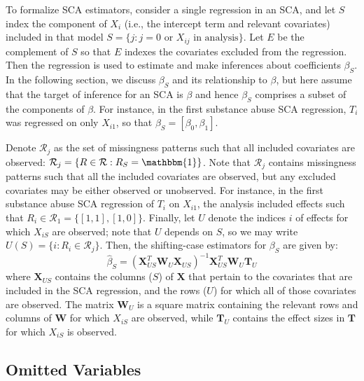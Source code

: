 \documentclass[
]{article}
\begin{document}
To formalize SCA estimators, consider a single regression in an SCA, and let \(S\) index the component of \(X_i\) (i.e., the intercept term and relevant covariates) included in that model \(S = \{j : j = 0 \text{ or } X_{ij} \text{ in analysis}\}\).
Let \(E\) be the complement of \(S\) so that \(E\) indexes the covariates excluded from the regression.
Then the regression is used to estimate and make inferences about coefficients \(\beta_S\).
In the following section, we discuss \(\beta_S\) and its relationship to \(\beta\), but here assume that the target of inference for an SCA is \(\beta\) and hence \(\beta_S\) comprises a subset of the components of \(\beta\).
For instance, in the first substance abuse SCA regression, \(T_i\) was regressed on only \(X_{i1}\), so that \(\beta_S = [\beta_0, \beta_1]\).

Denote \(\mathcal{R}_j\) as the set of missingness patterns such that all included covariates are observed: \(\mathcal{R}_j = \{R \in \mathcal{R}: R_S = \mathbbm{1}\}\).
Note that \(\mathcal{R}_j\) contains missingness patterns such that all the included covariates are observed, but any excluded covariates may be either observed or unobserved.
For instance, in the first substance abuse SCA regression of \(T_i\) on \(X_{i1}\), the analysis included effects such that \(R_i \in \mathcal{R}_1 = \{[1,1], [1,0]\}\).
Finally, let \(U\) denote the indices \(i\) of effects for which \(X_{iS}\) are observed; note that \(U\) depends on \(S\), so we may write \(U(S) = \{i : R_i \in \mathcal{R}_j\}\).
Then, the shifting-case estimators for \(\beta_S\) are given by:
\begin{equation}
\hat{\beta}_S = 
(\mathbf{X}_{US}^T \mathbf{W}_U \mathbf{X}_{US})^{-1} \mathbf{X}_{US}^T \mathbf{W}_U \mathbf{T}_U
\label{eq:beta-s}
\end{equation}
where \(\mathbf{X}_{US}\) contains the columns (\(S\)) of \(\mathbf{X}\) that pertain to the covariates that are included in the SCA regression, and the rows (\(U\)) for which all of those covariates are observed.
The matrix \(\mathbf{W}_U\) is a square matrix containing the relevant rows and columns of \(\mathbf{W}\) for which \(X_{iS}\) are observed, while \(\mathbf{T}_U\) contains the effect sizes in \(\mathbf{T}\) for which \(X_{iS}\) is observed.

\hypertarget{omitted-variables}{%
\subsection{Omitted Variables}\label{omitted-variables}}
\end{document}
